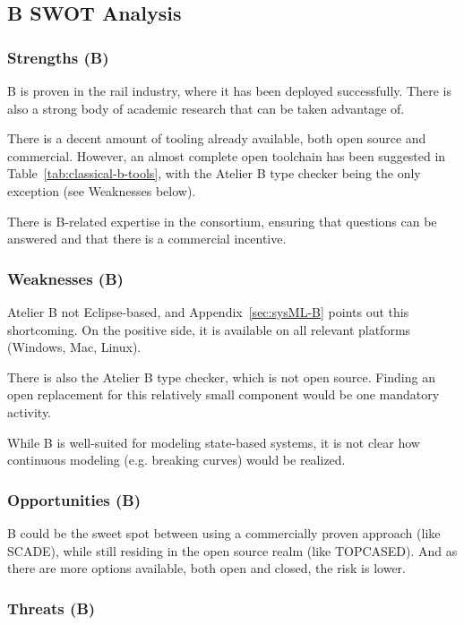 \subsection{B SWOT Analysis}

\subsubsection{Strengths (B)}

B is proven in the rail industry, where it has been deployed successfully.  There is also a strong body of academic research that can be taken advantage of.

There is a decent amount of tooling already available, both open source and commercial.  However, an almost complete open toolchain has been suggested in Table~\ref{tab:classical-b-tools}, with the Atelier B type checker being the only exception (see Weaknesses below).

There is B-related expertise in the consortium, ensuring that questions can be answered and that there is a commercial incentive.

\subsubsection{Weaknesses (B)}

Atelier B not Eclipse-based, and Appendix~\ref{sec:sysML-B} points out this shortcoming.  On the positive side, it is available on all relevant platforms (Windows, Mac, Linux).

There is also the Atelier B type checker, which is not open source.  Finding an open replacement for this relatively small component would be one mandatory activity.

While B is well-suited for modeling state-based systems, it is not clear how continuous modeling (e.g. breaking curves) would be realized.


\subsubsection{Opportunities (B)}

B could be the sweet spot between using a commercially proven approach (like SCADE), while still residing in the open source realm (like TOPCASED).  And as there are more options available, both open and closed, the risk is lower.

\subsubsection{Threats (B)}

